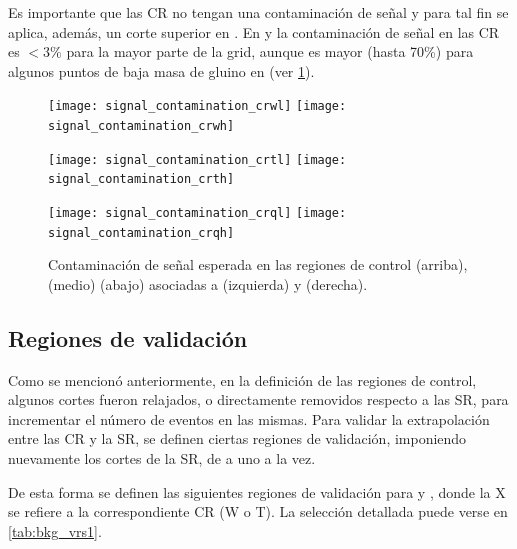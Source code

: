 
Es importante que las CR no tengan una contaminación de señal y para tal fin se
aplica, además, un corte superior en {\met}. En {\CRW} y {\CRT} la contaminación
de señal en las CR es $<3\%$ para la mayor parte de la grid, aunque es mayor
(hasta 70\%) para algunos puntos de baja masa de gluino en {\CRTL} (ver
\cref{fig:bkg_cr_contamination}).

\begin{figure}[!htbp]
  \centering

  \texttt{[image: signal\_contamination\_crwl]}\hspace{1cm}
  \texttt{[image: signal\_contamination\_crwh]}

  \texttt{[image: signal\_contamination\_crtl]}\hspace{1cm}
  \texttt{[image: signal\_contamination\_crth]}

  \texttt{[image: signal\_contamination\_crql]}\hspace{1cm}
  \texttt{[image: signal\_contamination\_crqh]}


  \caption{Contaminación de señal esperada en las regiones de control {\CRW} (arriba),
    {\CRT} (medio) {\CRQ} (abajo) asociadas a {\SRL} (izquierda) y {\SRH} (derecha).}
  \label{fig:bkg_cr_contamination}
\end{figure}



\subsection{Regiones de validación}

Como se mencionó anteriormente, en la definición de las regiones de control,
algunos cortes fueron relajados, o directamente removidos respecto a las SR,
para incrementar el número de eventos en las mismas. Para validar la
extrapolación entre las CR y la SR, se definen ciertas regiones de validación,
imponiendo nuevamente los cortes de la SR, de a uno a la vez.

De esta forma se definen las siguientes regiones de validación para {\CRW} y
{\CRT}, donde la X se refiere a la correspondiente CR (W o T). La selección
detallada puede verse en \cref{tab:bkg_vrs1}.

